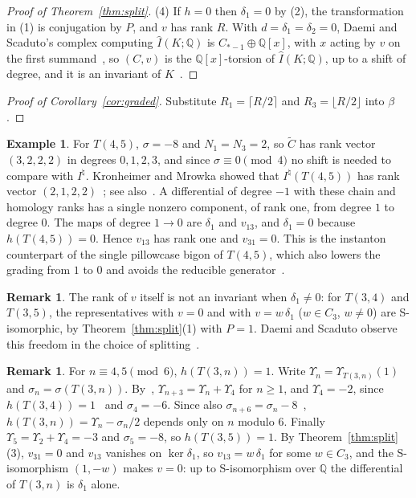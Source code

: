 \documentclass[11pt,reqno]{amsart}
\theoremstyle{plain}
\theoremstyle{definition}
\newtheorem{remark}[theorem]{Remark}
\newtheorem{example}[theorem]{Example}
\newcommand{\Q}{\mathbb{Q}}
\newcommand{\Inat}{I^{\natural}}
\newcommand{\tC}{\widetilde C}
\begin{document}
\begin{proof}[Proof of Theorem~\ref{thm:split}]
(4) If $h=0$ then $\delta_1=0$ by (2), the transformation in (1) is conjugation by $P$, and $v$ has rank
$R$. With $d=\delta_1=\delta_2=0$, Daemi and Scaduto's complex computing $\widehat I(K;\Q)$ is
$C_{*-1}\oplus\Q[x]$, with $x$ acting by $v$ on the first summand~\cite[\S4.3, Lemma~4.11]{DSEquiv}, so
$(C,v)$ is the $\Q[x]$-torsion of $\widehat I(K;\Q)$, up to a shift of degree, and it is an invariant of
$K$~\cite[Thm.~1.4]{DSEquiv}.
\end{proof}

\begin{proof}[Proof of Corollary~\ref{cor:graded}]
Substitute $R_1=\lceil R/2\rceil$ and $R_3=\lfloor R/2\rfloor$ into $\beta$.
\end{proof}

\begin{example}\label{ex:45}
For $T(4,5)$, $\sigma=-8$ and $N_1=N_3=2$, so $\tC$ has rank vector $(3,2,2,2)$ in degrees $0,1,2,3$, and
since $\sigma\equiv0\pmod4$ no shift is needed to compare with $\Inat$. Kronheimer and Mrowka showed that
$\Inat(T(4,5))$ has rank vector $(2,1,2,2)$~\cite[\S11]{KMfilt}; see also~\cite[\S12.5]{HHK1}. A
differential of degree $-1$ with these chain and homology ranks has a single nonzero component, of rank
one, from degree $1$ to degree $0$. The maps of degree $1\to0$ are $\delta_1$ and $v_{13}$, and $\delta_1=0$
because $h(T(4,5))=0$. Hence $v_{13}$ has rank one and $v_{31}=0$. This is the instanton counterpart of
the single pillowcase bigon of $T(4,5)$, which also lowers the grading from $1$ to $0$ and avoids the
reducible generator~\cite[\S11.8]{HHK2}.
\end{example}

\begin{remark}\label{rem:vnotinv}
The rank of $v$ itself is not an invariant when $\delta_1\neq0$: for $T(3,4)$ and $T(3,5)$, the
representatives with $v=0$ and with $v=w\,\delta_1$ ($w\in C_3$, $w\ne0$) are S-isomorphic, by
Theorem~\ref{thm:split}(1) with $P=1$. Daemi and Scaduto observe this freedom in the choice of
splitting~\cite[Rem.~4.4]{DSEquiv}.
\end{remark}

\begin{remark}\label{rem:3n}
For $n\equiv4,5\pmod6$, $h(T(3,n))=1$. Write $\Upsilon_n=\Upsilon_{T(3,n)}(1)$ and
$\sigma_n=\sigma(T(3,n))$. By~\cite[Prop.~2.2]{FK}, $\Upsilon_{n+3}=\Upsilon_n+\Upsilon_4$ for $n\ge1$, and
$\Upsilon_4=-2$, since $h(T(3,4))=1$~\cite[\S4.1, Prop.~10]{DScaduto} and $\sigma_4=-6$. Since also
$\sigma_{n+6}=\sigma_n-8$~\cite[Thm.~5.2]{GLM}, $h(T(3,n))=\Upsilon_n-\sigma_n/2$ depends only on $n$ modulo
$6$. Finally $\Upsilon_5=\Upsilon_2+\Upsilon_4=-3$ and $\sigma_5=-8$, so $h(T(3,5))=1$. By Theorem~\ref{thm:split}(3), $v_{31}=0$ and $v_{13}$ vanishes on $\ker\delta_1$, so
$v_{13}=w\,\delta_1$ for some $w\in C_3$, and the S-isomorphism $(1,-w)$ makes $v=0$: up to S-isomorphism
over $\Q$ the differential of $T(3,n)$ is $\delta_1$ alone.
\end{remark}
\end{document}
